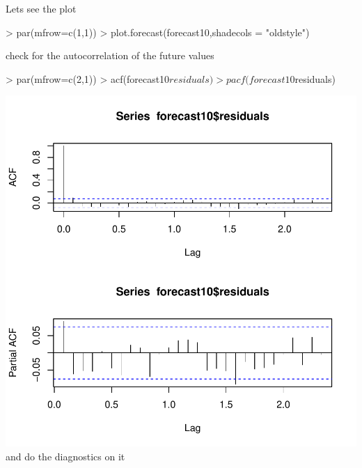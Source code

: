 \documentclass[11pt, a4paper]{article} %
\begin{document}
Lets see the plot\\
\begin{Schunk}
\begin{Sinput}
> par(mfrow=c(1,1))
> plot.forecast(forecast10,shadecols = "oldstyle")
\end{Sinput}
\end{Schunk}
check for the autocorrelation of the future values\\
\begin{Schunk}
\begin{Sinput}
> par(mfrow=c(2,1))
> acf(forecast10$residuals)
> pacf(forecast10$residuals)
\end{Sinput}
\end{Schunk}
\includegraphics{alleselena-063}
and do the diagnostics on it\\
\end{document}
